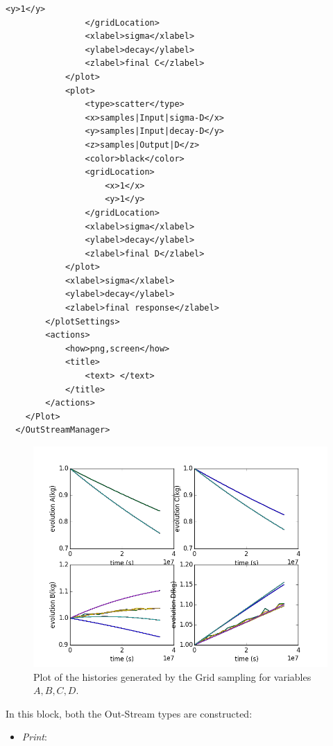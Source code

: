 \begin{enumerate}
\begin{lstlisting}[style=XML,morekeywords={arg,extension,pauseAtEnd,overwrite}]
                    <y>1</y>
                </gridLocation>
                <xlabel>sigma</xlabel>
                <ylabel>decay</ylabel>
                <zlabel>final C</zlabel>
            </plot>
            <plot>
                <type>scatter</type>
                <x>samples|Input|sigma-D</x>
                <y>samples|Input|decay-D</y>
                <z>samples|Output|D</z>
                <color>black</color>
                <gridLocation>
                    <x>1</x>
                    <y>1</y>
                </gridLocation>
                <xlabel>sigma</xlabel>
                <ylabel>decay</ylabel>
                <zlabel>final D</zlabel>
            </plot>
            <xlabel>sigma</xlabel>
            <ylabel>decay</ylabel>
            <zlabel>final response</zlabel>
        </plotSettings>
        <actions>
            <how>png,screen</how>
            <title>
                <text> </text>
            </title>
        </actions>
    </Plot>
  </OutStreamManager>
\end{lstlisting}
 \begin{figure}[h!]
  \centering
  \includegraphics[scale=0.7]{pics/Grid_histories.png}
  \caption{Plot of the histories generated by the Grid sampling for variables $A,B,C,D$.}
  \label{fig:historiesGridPlotLine}
 \end{figure}
  In this block, both the Out-Stream types are constructed: 
  \begin{itemize}
    \item \textit{Print}: 

\end{itemize}
\end{enumerate}
